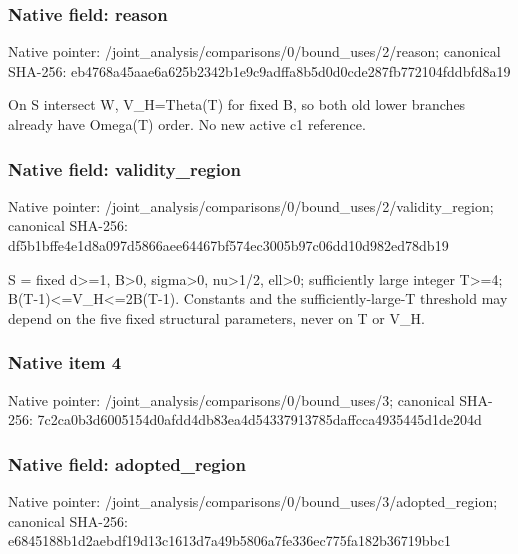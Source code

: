 \documentclass[10pt,a4paper]{article}
\begin{document}
\subsubsection{Native field: reason}
Native pointer: /joint\_\allowbreak{}analysis/comparisons/0/bound\_\allowbreak{}uses/2/reason; canonical SHA-256: eb4768a45aae6a625b2342b1e9c9adffa8b5d0d0cde287fb772104fddbfd8a19

\begingroup\raggedright\sloppy On S intersect W,\allowbreak{} V\_\allowbreak{}H=\allowbreak{}Theta(T) for fixed B,\allowbreak{} so both old lower branches already have Omega(T) order. No new active c1 reference.\par\endgroup

\subsubsection{Native field: validity\_\allowbreak{}region}
Native pointer: /joint\_\allowbreak{}analysis/comparisons/0/bound\_\allowbreak{}uses/2/validity\_\allowbreak{}region; canonical SHA-256: df5b1bffe4e1d8a097d5866aee64467bf574ec3005b97c06dd10d982ed78db19

\begingroup\raggedright\sloppy S =\allowbreak{} fixed d>=\allowbreak{}1,\allowbreak{} B>0,\allowbreak{} sigma>0,\allowbreak{} nu>1/\allowbreak{}2,\allowbreak{} ell>0;\allowbreak{} sufficiently large integer T>=\allowbreak{}4;\allowbreak{} B(T-1)<=\allowbreak{}V\_\allowbreak{}H<=\allowbreak{}2B(T-1). Constants and the sufficiently-large-T threshold may depend on the five fixed structural parameters,\allowbreak{} never on T or V\_\allowbreak{}H.\par\endgroup

\subsubsection{Native item 4}
Native pointer: /joint\_\allowbreak{}analysis/comparisons/0/bound\_\allowbreak{}uses/3; canonical SHA-256: 7c2ca0b3d6005154d0afdd4db83ea4d54337913785daffcca4935445d1de204d

\subsubsection{Native field: adopted\_\allowbreak{}region}
Native pointer: /joint\_\allowbreak{}analysis/comparisons/0/bound\_\allowbreak{}uses/3/adopted\_\allowbreak{}region; canonical SHA-256: e6845188b1d2aebdf19d13c1613d7a49b5806a7fe336ec775fa182b36719bbc1
\end{document}
